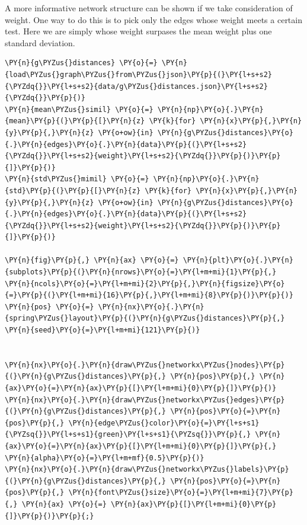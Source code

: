 A more informative network structure can be shown if we take
consideration of weight. One way to do this is to pick only the edges
whose weight meets a certain test. Here we are simply whose weight
surpases the mean weight plus one standard deviation.

    \begin{tcolorbox}[breakable, size=fbox, boxrule=1pt, pad at break*=1mm,colback=cellbackground, colframe=cellborder]
\begin{Verbatim}[commandchars=\\\{\}]
\PY{n}{g\PYZus{}distances} \PY{o}{=} \PY{n}{load\PYZus{}graph\PYZus{}from\PYZus{}json}\PY{p}{(}\PY{l+s+s2}{\PYZdq{}}\PY{l+s+s2}{data/g\PYZus{}distances.json}\PY{l+s+s2}{\PYZdq{}}\PY{p}{)}
\PY{n}{mean\PYZus{}simil} \PY{o}{=} \PY{n}{np}\PY{o}{.}\PY{n}{mean}\PY{p}{(}\PY{p}{[}\PY{n}{z} \PY{k}{for} \PY{n}{x}\PY{p}{,}\PY{n}{y}\PY{p}{,}\PY{n}{z} \PY{o+ow}{in} \PY{n}{g\PYZus{}distances}\PY{o}{.}\PY{n}{edges}\PY{o}{.}\PY{n}{data}\PY{p}{(}\PY{l+s+s2}{\PYZdq{}}\PY{l+s+s2}{weight}\PY{l+s+s2}{\PYZdq{}}\PY{p}{)}\PY{p}{]}\PY{p}{)}
\PY{n}{std\PYZus{}mimil} \PY{o}{=} \PY{n}{np}\PY{o}{.}\PY{n}{std}\PY{p}{(}\PY{p}{[}\PY{n}{z} \PY{k}{for} \PY{n}{x}\PY{p}{,}\PY{n}{y}\PY{p}{,}\PY{n}{z} \PY{o+ow}{in} \PY{n}{g\PYZus{}distances}\PY{o}{.}\PY{n}{edges}\PY{o}{.}\PY{n}{data}\PY{p}{(}\PY{l+s+s2}{\PYZdq{}}\PY{l+s+s2}{weight}\PY{l+s+s2}{\PYZdq{}}\PY{p}{)}\PY{p}{]}\PY{p}{)}

\PY{n}{fig}\PY{p}{,} \PY{n}{ax} \PY{o}{=} \PY{n}{plt}\PY{o}{.}\PY{n}{subplots}\PY{p}{(}\PY{n}{nrows}\PY{o}{=}\PY{l+m+mi}{1}\PY{p}{,} \PY{n}{ncols}\PY{o}{=}\PY{l+m+mi}{2}\PY{p}{,}\PY{n}{figsize}\PY{o}{=}\PY{p}{(}\PY{l+m+mi}{16}\PY{p}{,}\PY{l+m+mi}{8}\PY{p}{)}\PY{p}{)}
\PY{n}{pos} \PY{o}{=} \PY{n}{nx}\PY{o}{.}\PY{n}{spring\PYZus{}layout}\PY{p}{(}\PY{n}{g\PYZus{}distances}\PY{p}{,} \PY{n}{seed}\PY{o}{=}\PY{l+m+mi}{121}\PY{p}{)}


\PY{n}{nx}\PY{o}{.}\PY{n}{draw\PYZus{}networkx\PYZus{}nodes}\PY{p}{(}\PY{n}{g\PYZus{}distances}\PY{p}{,} \PY{n}{pos}\PY{p}{,} \PY{n}{ax}\PY{o}{=}\PY{n}{ax}\PY{p}{[}\PY{l+m+mi}{0}\PY{p}{]}\PY{p}{)}
\PY{n}{nx}\PY{o}{.}\PY{n}{draw\PYZus{}networkx\PYZus{}edges}\PY{p}{(}\PY{n}{g\PYZus{}distances}\PY{p}{,} \PY{n}{pos}\PY{o}{=}\PY{n}{pos}\PY{p}{,} \PY{n}{edge\PYZus{}color}\PY{o}{=}\PY{l+s+s1}{\PYZsq{}}\PY{l+s+s1}{green}\PY{l+s+s1}{\PYZsq{}}\PY{p}{,} \PY{n}{ax}\PY{o}{=}\PY{n}{ax}\PY{p}{[}\PY{l+m+mi}{0}\PY{p}{]}\PY{p}{,} \PY{n}{alpha}\PY{o}{=}\PY{l+m+mf}{0.5}\PY{p}{)}
\PY{n}{nx}\PY{o}{.}\PY{n}{draw\PYZus{}networkx\PYZus{}labels}\PY{p}{(}\PY{n}{g\PYZus{}distances}\PY{p}{,} \PY{n}{pos}\PY{o}{=}\PY{n}{pos}\PY{p}{,} \PY{n}{font\PYZus{}size}\PY{o}{=}\PY{l+m+mi}{7}\PY{p}{,} \PY{n}{ax} \PY{o}{=} \PY{n}{ax}\PY{p}{[}\PY{l+m+mi}{0}\PY{p}{]}\PY{p}{)}\PY{p}{;}


\end{Verbatim}
\end{tcolorbox}
